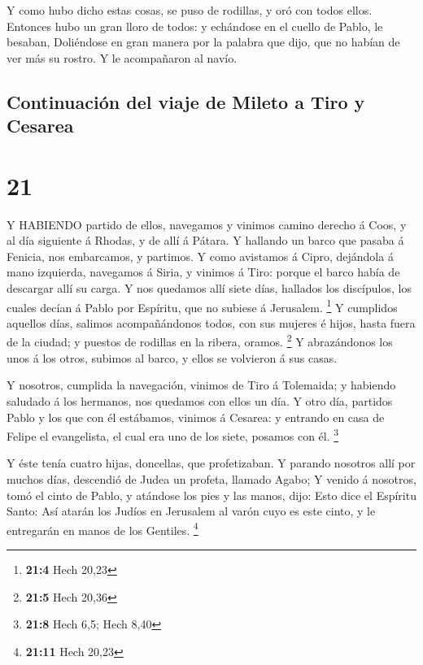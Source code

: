 Y como hubo dicho estas cosas, se puso de rodillas, y oró
con todos ellos.  Entonces hubo un gran lloro de todos: y
echándose en el cuello de Pablo, le besaban,  Doliéndose en
gran manera por la palabra que dijo, que no habían de ver más su rostro.
Y le acompañaron al navío.

\hypertarget{continuaciuxf3n-del-viaje-de-mileto-a-tiro-y-cesarea}{%
\subsection{Continuación del viaje de Mileto a Tiro y
Cesarea}\label{continuaciuxf3n-del-viaje-de-mileto-a-tiro-y-cesarea}}

\hypertarget{section-20}{%
\section{21}\label{section-20}}

 Y HABIENDO partido de ellos, navegamos y vinimos camino
derecho á Coos, y al día siguiente á Rhodas, y de allí á Pátara.
 Y hallando un barco que pasaba á Fenicia, nos embarcamos, y
partimos.  Y como avistamos á Cipro, dejándola á mano
izquierda, navegamos á Siria, y vinimos á Tiro: porque el barco había de
descargar allí su carga.  Y nos quedamos allí siete días,
hallados los discípulos, los cuales decían á Pablo por Espíritu, que no
subiese á Jerusalem. \footnote{\textbf{21:4} Hech 20,23}  Y
cumplidos aquellos días, salimos acompañándonos todos, con sus mujeres é
hijos, hasta fuera de la ciudad; y puestos de rodillas en la ribera,
oramos. \footnote{\textbf{21:5} Hech 20,36}  Y abrazándonos
los unos á los otros, subimos al barco, y ellos se volvieron á sus
casas.

 Y nosotros, cumplida la navegación, vinimos de Tiro á
Tolemaida; y habiendo saludado á los hermanos, nos quedamos con ellos un
día.  Y otro día, partidos Pablo y los que con él estábamos,
vinimos á Cesarea: y entrando en casa de Felipe el evangelista, el cual
era uno de los siete, posamos con él. \footnote{\textbf{21:8} Hech 6,5;
  Hech 8,40}

 Y éste tenía cuatro hijas, doncellas, que profetizaban.
 Y parando nosotros allí por muchos días, descendió de
Judea un profeta, llamado Agabo;  Y venido á nosotros, tomó
el cinto de Pablo, y atándose los pies y las manos, dijo: Esto dice el
Espíritu Santo: Así atarán los Judíos en Jerusalem al varón cuyo es este
cinto, y le entregarán en manos de los Gentiles. \footnote{\textbf{21:11}
  Hech 20,23}

